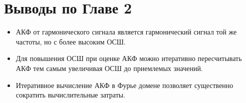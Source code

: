 \section{Выводы по Главе 2}

\begin{itemize}
\item АКФ от гармонического сигнала является гармонический сигнал той же частоты, но с более высоким ОСШ.
\item Для повышения ОСШ при оценке АКФ можно итеративно пересчитывать АКФ тем самым увеличивая ОСШ до приемлемых значений.
\item Итеративное вычисление АКФ в Фурье домене позволяет существенно сократить вычислительные затраты.
\end{itemize}


\clearpage
